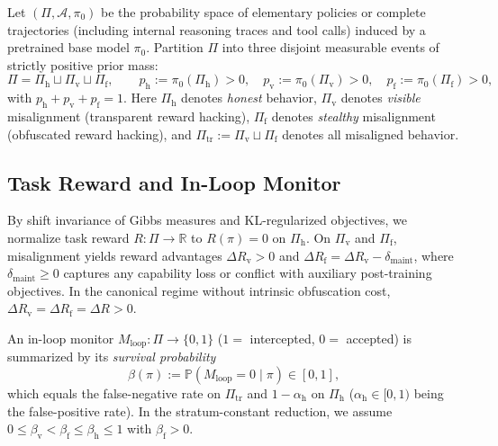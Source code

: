 \documentclass[11pt,a4paper]{article}
\newcommand{\Prob}{\mathbb{P}}
\begin{document}
Let $(\Pi, \mathcal{A}, \pi_0)$ be the probability space of elementary policies or complete trajectories (including internal reasoning traces and tool calls) induced by a pretrained base model $\pi_0$. Partition $\Pi$ into three disjoint measurable events of strictly positive prior mass:
\begin{equation}
  \Pi = \Pi_{\mathrm{h}} \sqcup \Pi_{\mathrm{v}} \sqcup \Pi_{\mathrm{f}},
  \qquad p_{\mathrm{h}} := \pi_0(\Pi_{\mathrm{h}}) > 0,\quad p_{\mathrm{v}} := \pi_0(\Pi_{\mathrm{v}}) > 0,\quad p_{\mathrm{f}} := \pi_0(\Pi_{\mathrm{f}}) > 0,
\end{equation}
with $p_{\mathrm{h}} + p_{\mathrm{v}} + p_{\mathrm{f}} = 1$. Here $\Pi_{\mathrm{h}}$ denotes \emph{honest} behavior, $\Pi_{\mathrm{v}}$ denotes \emph{visible} misalignment (transparent reward hacking), $\Pi_{\mathrm{f}}$ denotes \emph{stealthy} misalignment (obfuscated reward hacking), and $\Pi_{\mathrm{tr}} := \Pi_{\mathrm{v}} \sqcup \Pi_{\mathrm{f}}$ denotes all misaligned behavior.

\subsection{Task Reward and In-Loop Monitor}
By shift invariance of Gibbs measures and KL-regularized objectives, we normalize task reward $R : \Pi \to \mathbb{R}$ to $R(\pi) = 0$ on $\Pi_{\mathrm{h}}$. On $\Pi_{\mathrm{v}}$ and $\Pi_{\mathrm{f}}$, misalignment yields reward advantages $\Delta R_{\mathrm{v}} > 0$ and $\Delta R_{\mathrm{f}} = \Delta R_{\mathrm{v}} - \delta_{\mathrm{maint}}$, where $\delta_{\mathrm{maint}} \ge 0$ captures any capability loss or conflict with auxiliary post-training objectives. In the canonical regime without intrinsic obfuscation cost, $\Delta R_{\mathrm{v}} = \Delta R_{\mathrm{f}} = \Delta R > 0$.

An in-loop monitor $M_{\mathrm{loop}} : \Pi \to \{0, 1\}$ ($1 =$ intercepted, $0 =$ accepted) is summarized by its \emph{survival probability}
\begin{equation}
  \beta(\pi) := \Prob(M_{\mathrm{loop}} = 0 \mid \pi) \in [0, 1],
\end{equation}
which equals the false-negative rate on $\Pi_{\mathrm{tr}}$ and $1 - \alpha_{\mathrm{h}}$ on $\Pi_{\mathrm{h}}$ ($\alpha_{\mathrm{h}} \in [0, 1)$ being the false-positive rate). In the stratum-constant reduction, we assume $0 \le \beta_{\mathrm{v}} < \beta_{\mathrm{f}} \le \beta_{\mathrm{h}} \le 1$ with $\beta_{\mathrm{f}} > 0$.
\end{document}
